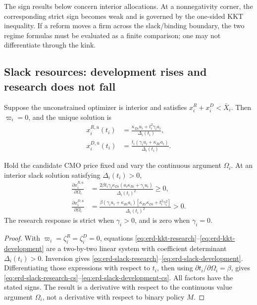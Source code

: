 The sign results below concern interior allocations. At a nonnegativity
corner, the corresponding strict sign becomes weak and is governed by the
one-sided KKT inequality. If a reform moves a firm across the slack/binding
boundary, the two regime formulas must be evaluated as a finite comparison;
one may not differentiate through the kink.

\subsection{Slack resources: development rises and research does not fall}
\label{subsec:erd-slack}

Suppose the unconstrained optimizer is interior and satisfies
\(x_i^R+x_i^D<\bar X_i\). Then \(\varpi_i=0\), and the unique solution is
\begin{align}
  x_i^{R,u}(t_i)
  &=
  \frac{\kappa_{Di}u_i+t_i^2\gamma_i a_i}
       {\Delta_i(t_i)},
  \label{eq:erd-slack-research}\\
  x_i^{D,u}(t_i)
  &=
  \frac{t_i(\gamma_i u_i+\kappa_{Ri}a_i)}
       {\Delta_i(t_i)}.
  \label{eq:erd-slack-development}
\end{align}

\begin{extensionproposition}
\label{prop:erd-slack}
Hold the candidate CMO price fixed and vary the continuous argument
\(\Omega_i\). At an interior slack solution satisfying
\(\Delta_i(t_i)>0\),
\begin{align}
  \frac{\partial x_i^{R,u}}{\partial\Omega_i}
  &=
  \frac{2\beta t_i\gamma_i\kappa_{Di}
        (a_i\kappa_{Ri}+\gamma_i u_i)}
       {\Delta_i(t_i)^2}
  \geq0,
  \label{eq:erd-slack-research-cs}\\
  \frac{\partial x_i^{D,u}}{\partial\Omega_i}
  &=
  \frac{\beta(\gamma_i u_i+\kappa_{Ri}a_i)
        [\kappa_{Ri}\kappa_{Di}+t_i^2\gamma_i^2]}
       {\Delta_i(t_i)^2}
  >0.
  \label{eq:erd-slack-development-cs}
\end{align}
The research response is strict when \(\gamma_i>0\), and is zero when
\(\gamma_i=0\).
\end{extensionproposition}

\begin{proof}
With \(\varpi_i=\zeta_i^R=\zeta_i^D=0\), equations
\eqref{eq:erd-kkt-research}--\eqref{eq:erd-kkt-development} are a two-by-two
linear system with coefficient determinant \(\Delta_i(t_i)>0\). Inversion
gives \eqref{eq:erd-slack-research}--\eqref{eq:erd-slack-development}.
Differentiating those expressions with respect to \(t_i\), then using
\(\partial t_i/\partial\Omega_i=\beta\), gives
\eqref{eq:erd-slack-research-cs}--\eqref{eq:erd-slack-development-cs}.
All factors have the stated signs. The result is a derivative with respect to
the continuous value argument \(\Omega_i\), not a derivative with respect to
binary policy \(M\).
\end{proof}

